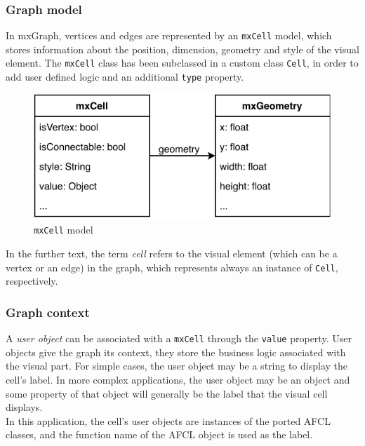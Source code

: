 \documentclass[a4paper,top=25mm,bottom=25mm,12pt,pdftex,halfparskip,twoside,bibtotoc,numbers=noenddot]{scrbook}
\begin{document}
\subsubsection{Graph model}

In mxGraph, vertices and edges are represented by an \texttt{mxCell} model, which stores information about the position, dimension, geometry and style of the visual element. The \texttt{mxCell} class has been subclassed in a custom class \texttt{Cell}, in order to add user defined logic and an additional \texttt{type} property.

\begin{figure}[H]
  \centering
  \vspace{0.8cm}
  \includegraphics[]{mxCell}
  \caption{\texttt{mxCell} model}
\end{figure}

In the further text, the term \textit{cell} refers to the visual element (which can be a vertex or an edge) in the graph, which represents always an instance of \texttt{Cell}, respectively.

\subsubsection{Graph context}


A \textit{user object} can be associated with a \texttt{mxCell} through the \texttt{value} property. User objects give the graph its context, they store the business logic associated with the visual part. \cite{manuals-mxgraph-user-manual} For simple cases, the user object may be a string to display the cell's label. In more complex applications, the user object may be an object and some property of that object will generally be the label that the visual cell displays.\\
In this application, the cell's user objects are instances of the ported AFCL classes, and the function name of the AFCL object is used as the label.
\end{document}
